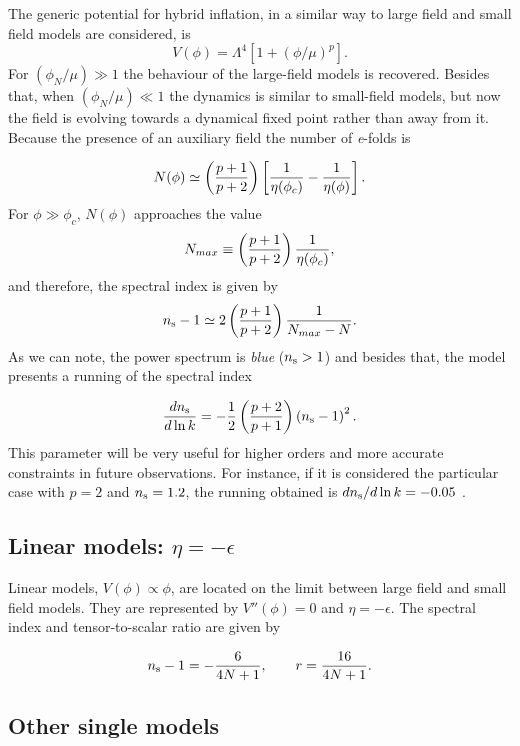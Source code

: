 \documentclass{rmaa}
\def\beq{\begin{equation}}
\def\eeq{\end{equation}}
\begin{document}
The generic potential for hybrid inflation, in a similar way to large field and small field models
are considered, is
\begin{equation}
V\left(\phi\right) = \Lambda^4 \left[1 + \left(\phi / \mu\right)^p\right].
\end{equation}
%
For $\left({\phi_N / \mu}\right)\gg 1$ the behaviour of
 the large-field models is recovered. Besides that, when $\left({\phi_N /
\mu}\right)\ll 1$ the dynamics is similar to small-field models, but
now the field is evolving towards a dynamical fixed point rather than away from it.  
%
Because the presence of an auxiliary field the number of {\it e}-folds is

\beq
N(\phi)\simeq \left( {p+1 \over p+2} \right)\left[ {1 \over \eta(\phi_c) }- {1 \over \eta(\phi)}\right]. 
\eeq
%
For $\phi \gg \phi_c$, $N(\phi)$ approaches the value
%
\beq
N_{max}\equiv \left( {p+1 \over p+2} \right) {1 \over \eta (\phi_c)},
\eeq
%
and therefore, the spectral index is given by
 $$
n_{\rm s}-1 \simeq 2 \left( \frac{p+1}{p+2}\right) \frac{1}{N_{max}-N}.
 $$
%
As we can note, the power spectrum is \textit{blue} ($n_{\rm s}>1$) and besides that, the model presents 
a running of the spectral index

\begin{equation}
\label{eq:dsirunning}
{dn_{\rm s} \over d\ln{k}} = -{1 \over 2} \left({p + 2 \over p + 1}\right) 
\left(n_{\rm s} - 1\right)^2.
\end{equation}
%
 This parameter  will be very useful for higher orders and more accurate constraints in 
 future observations. For instance, if it is considered the particular case with $p = 2$ 
 and $n_{\rm s} = 1.2$, the running obtained is $dn_{\rm s} / d\ln{k} = -0.05$ \citep{Kinney3}. 

\subsection{Linear models: $\eta = - \epsilon$}


Linear models, $V\left(\phi\right) \propto \phi$, are located on the limit between
large field and small field models. They are represented by $V''\left(\phi\right) = 0$ and $\eta =
- \epsilon$. The spectral index and tensor-to-scalar ratio are given by 

\beq
n_{\rm s}-1=-{6\over 4N+1},\qquad
r = {16 \over 4N+1} .
\eeq

\subsection{Other single models}
\end{document}
